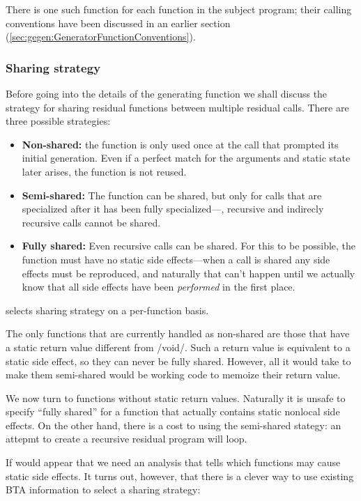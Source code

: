 \begin{docpart}
There is one such function for each function in the subject program;
their calling conventions have been discussed in an earlier section
(\ref{sec:gegen:GeneratorFunctionConventions}).

\subsubsection{Sharing strategy}
Before going into the details of the generating function we shall
discuss the strategy for sharing residual functions between multiple
residual calls. There are three possible strategies:
\begin{itemize}
\item \textbf{Non-shared:} the function is only used once at the
	call that prompted its initial generation. Even if a
	perfect match for the arguments and static state later
	arises, the function is not reused.
\item \textbf{Semi-shared:} The function
	can be shared, but only for calls that are specialized
	after it has been fully specialized---\ie, recursive
	and indirecly recursive calls cannot be shared.
\item \textbf{Fully shared:} Even recursive calls can be shared.
	For this to be possible, the function must have no
	static side effects---when a call is shared any side
	effects must be reproduced, and naturally that can't
	happen until we actually know that all side effects have
	been \emph{performed} in the first place.
\end{itemize}
\cmix{} selects sharing strategy on a per-function basis.

The only functions that are currently handled as non-shared are those
that have a static return value different from /void/. Such a return
value is equivalent to a static side effect, so they can never be
fully shared. However, all it would take to make them semi-shared
would be working code to memoize their return value.

We now turn to functions without static return values.
Naturally it is unsafe to specify ``fully shared'' for
a function that actually contains static nonlocal side
effects. On the other hand, there is a cost to using the
semi-shared stategy: an attepmt to create a recursive
residual program will loop.

If would appear that we need an analysis that tells which functions
may cause static side effects. It turns out, however, that there is
a clever way to use existing BTA information to select a sharing
strategy:


\end{docpart}
